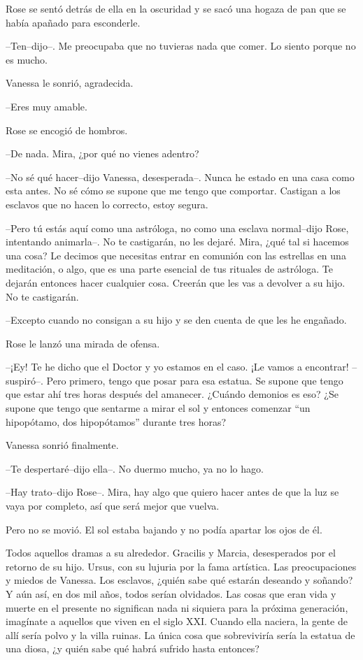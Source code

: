 Rose se sentó detrás de ella en la oscuridad y se sacó una hogaza de pan
que se había apañado para esconderle.

--Ten--dijo--. Me preocupaba que no tuvieras nada que comer. Lo siento
porque no es mucho.

Vanessa le sonrió, agradecida.

--Eres muy amable.

Rose se encogió de hombros.

--De nada. Mira, ¿por qué no vienes adentro?

--No sé qué hacer--dijo Vanessa, desesperada--. Nunca he estado en una
casa como esta antes. No sé cómo se supone que me tengo que comportar.
Castigan a los esclavos que no hacen lo correcto, estoy segura.

--Pero tú estás aquí como una astróloga, no como una esclava
normal--dijo Rose, intentando animarla--. No te castigarán, no les
dejaré. Mira, ¿qué tal si hacemos una cosa? Le decimos que necesitas
entrar en comunión con las estrellas en una meditación, o algo, que es
una parte esencial de tus rituales de astróloga. Te dejarán entonces
hacer cualquier cosa. Creerán que les vas a devolver a su hijo. No te
castigarán.

--Excepto cuando no consigan a su hijo y se den cuenta de que les he
engañado.

Rose le lanzó una mirada de ofensa.

--¡Ey! Te he dicho que el Doctor y yo estamos en el caso. ¡Le vamos a
encontrar! --suspiró--. Pero primero, tengo que posar para esa estatua.
Se supone que tengo que estar ahí tres horas después del amanecer.
¿Cuándo demonios es eso? ¿Se supone que tengo que sentarme a mirar el
sol y entonces comenzar ``un hipopótamo, dos hipopótamos'' durante tres
horas?

Vanessa sonrió finalmente.

--Te despertaré--dijo ella--. No duermo mucho, ya no lo hago.

--Hay trato--dijo Rose--. Mira, hay algo que quiero hacer antes de que
la luz se vaya por completo, así que será mejor que vuelva.

Pero no se movió. El sol estaba bajando y no podía apartar los ojos de
él.

Todos aquellos dramas a su alrededor. Gracilis y Marcia, desesperados
por el retorno de su hijo. Ursus, con su lujuria por la fama artística.
Las preocupaciones y miedos de Vanessa. Los esclavos, ¿quién sabe qué
estarán deseando y soñando? Y aún así, en dos mil años, todos serían
olvidados. Las cosas que eran vida y muerte en el presente no significan
nada ni siquiera para la próxima generación, imagínate a aquellos que
viven en el siglo XXI. Cuando ella naciera, la gente de allí sería polvo
y la villa ruinas. La única cosa que sobreviviría sería la estatua de
una diosa, ¿y quién sabe qué habrá sufrido hasta entonces?

